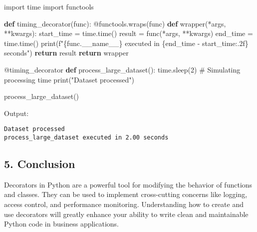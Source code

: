\documentclass[
  letterpaper,
  DIV=11,
  numbers=noendperiod]{scrreprt}
\newenvironment{Shaded}{\begin{snugshade}}{\end{snugshade}}
\newcommand{\AttributeTok}[1]{\textcolor[rgb]{0.40,0.45,0.13}{#1}}
\newcommand{\BuiltInTok}[1]{\textcolor[rgb]{0.00,0.23,0.31}{#1}}
\newcommand{\CommentTok}[1]{\textcolor[rgb]{0.37,0.37,0.37}{#1}}
\newcommand{\ControlFlowTok}[1]{\textcolor[rgb]{0.00,0.23,0.31}{\textbf{#1}}}
\newcommand{\DecValTok}[1]{\textcolor[rgb]{0.68,0.00,0.00}{#1}}
\newcommand{\ImportTok}[1]{\textcolor[rgb]{0.00,0.46,0.62}{#1}}
\newcommand{\KeywordTok}[1]{\textcolor[rgb]{0.00,0.23,0.31}{\textbf{#1}}}
\newcommand{\NormalTok}[1]{\textcolor[rgb]{0.00,0.23,0.31}{#1}}
\newcommand{\OperatorTok}[1]{\textcolor[rgb]{0.37,0.37,0.37}{#1}}
\newcommand{\SpecialCharTok}[1]{\textcolor[rgb]{0.37,0.37,0.37}{#1}}
\newcommand{\SpecialStringTok}[1]{\textcolor[rgb]{0.13,0.47,0.30}{#1}}
\newcommand{\StringTok}[1]{\textcolor[rgb]{0.13,0.47,0.30}{#1}}
\newcommand{\VariableTok}[1]{\textcolor[rgb]{0.07,0.07,0.07}{#1}}
\begin{document}
\begin{Shaded}
\begin{Highlighting}[]
\ImportTok{import}\NormalTok{ time}
\ImportTok{import}\NormalTok{ functools}

\KeywordTok{def}\NormalTok{ timing\_decorator(func):}
    \AttributeTok{@functools.wraps}\NormalTok{(func)}
    \KeywordTok{def}\NormalTok{ wrapper(}\OperatorTok{*}\NormalTok{args, }\OperatorTok{**}\NormalTok{kwargs):}
\NormalTok{        start\_time }\OperatorTok{=}\NormalTok{ time.time()}
\NormalTok{        result }\OperatorTok{=}\NormalTok{ func(}\OperatorTok{*}\NormalTok{args, }\OperatorTok{**}\NormalTok{kwargs)}
\NormalTok{        end\_time }\OperatorTok{=}\NormalTok{ time.time()}
        \BuiltInTok{print}\NormalTok{(}\SpecialStringTok{f"}\SpecialCharTok{\{}\NormalTok{func}\SpecialCharTok{.}\VariableTok{\_\_name\_\_}\SpecialCharTok{\}}\SpecialStringTok{ executed in }\SpecialCharTok{\{}\NormalTok{end\_time }\OperatorTok{{-}}\NormalTok{ start\_time}\SpecialCharTok{:.2f\}}\SpecialStringTok{ seconds"}\NormalTok{)}
        \ControlFlowTok{return}\NormalTok{ result}
    \ControlFlowTok{return}\NormalTok{ wrapper}

\AttributeTok{@timing\_decorator}
\KeywordTok{def}\NormalTok{ process\_large\_dataset():}
\NormalTok{    time.sleep(}\DecValTok{2}\NormalTok{)  }\CommentTok{\# Simulating processing time}
    \BuiltInTok{print}\NormalTok{(}\StringTok{"Dataset processed"}\NormalTok{)}

\NormalTok{process\_large\_dataset()}
\end{Highlighting}
\end{Shaded}

Output:

\begin{verbatim}
Dataset processed
process_large_dataset executed in 2.00 seconds
\end{verbatim}

\subsection{5. Conclusion}\label{conclusion-26}

Decorators in Python are a powerful tool for modifying the behavior of
functions and classes. They can be used to implement cross-cutting
concerns like logging, access control, and performance monitoring.
Understanding how to create and use decorators will greatly enhance your
ability to write clean and maintainable Python code in business
applications.
\end{document}
